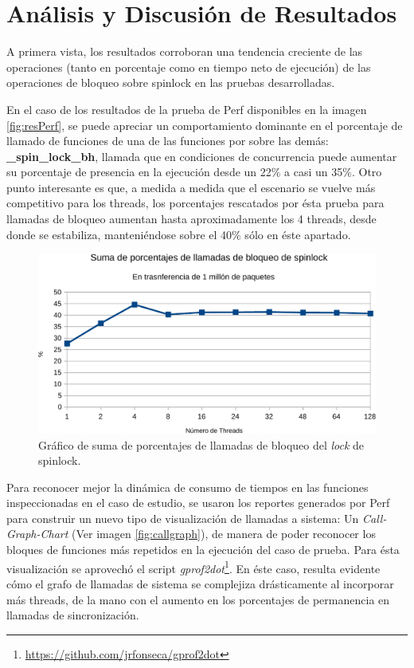 \section{Análisis y Discusión de Resultados}
A primera vista, los resultados corroboran una tendencia creciente de las operaciones (tanto en porcentaje como en tiempo neto de ejecución) de las operaciones de bloqueo sobre spinlock en las pruebas desarrolladas.

En el caso de los resultados de la prueba de Perf disponibles en la imagen \ref{fig:resPerf}, se puede apreciar un comportamiento dominante en el porcentaje de llamado de funciones de una de las funciones por sobre las demás: \textbf{\_spin\_lock\_bh}, llamada que en condiciones de concurrencia puede aumentar su porcentaje de presencia en la ejecución desde un 22\% a casi un 35\%. Otro punto interesante es que, a medida a medida que el escenario se vuelve más competitivo para los threads, los porcentajes rescatados por ésta prueba para llamadas de bloqueo aumentan hasta aproximadamente los 4 threads, desde donde se estabiliza, manteniéndose sobre el 40\% sólo en éste apartado.

\begin{figure}[!h]
	\centering
	\includegraphics[scale=.6]{resultados/sumaperf-crop.pdf}
	\caption{Gráfico de suma de porcentajes de llamadas de bloqueo del \emph{lock} de spinlock.}
	\label{fig:sumaperf}
\end{figure}

Para reconocer mejor la dinámica de consumo de tiempos en las funciones inspeccionadas en el caso de estudio, se usaron los reportes generados por Perf para construir un nuevo tipo de visualización de llamadas a sistema: Un \emph{Call-Graph-Chart} (Ver imagen \ref{fig:callgraph}), de manera de poder reconocer los bloques de funciones más repetidos en la ejecución del caso de prueba. Para ésta visualización se aprovechó el script \emph{gprof2dot}\footnote{\url{https://github.com/jrfonseca/gprof2dot}}. En éste caso, resulta evidente cómo el grafo de llamadas de sistema se complejiza drásticamente al incorporar más threads, de la mano con el aumento en los porcentajes de permanencia en llamadas de sincronización.


